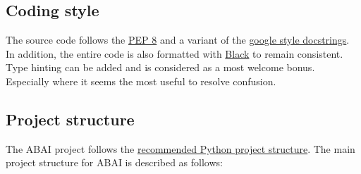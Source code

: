 \subsection{Coding style}
\label{subsec:coding-style}
The source code follows the \href{https://peps.python.org/pep-0008/}{PEP 8} and a variant of the \href{https://sphinxcontrib-napoleon.readthedocs.io/en/latest/example_google.html}{google style docstrings}. In addition,
the entire code is also formatted with \href{https://black.readthedocs.io/en/stable/getting_started.html}{Black} to remain consistent. Type hinting can be added and is considered as a most welcome bonus. Especially where it seems the most useful to resolve confusion.

\subsection{Project structure}
\label{subsec:project-structure}

The ABAI project follows the \href{https://packaging.python.org/en/latest/tutorials/packaging-projects/}{recommended Python project structure}. The main project structure for ABAI is described as follows: \\

\texttt{}


